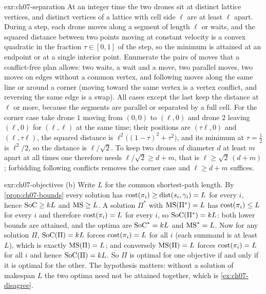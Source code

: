 \begin{solution}{exr:ch07-separation}
At an integer time the two drones sit at distinct lattice vertices, and distinct vertices of a lattice with cell side $\ell$ are at least $\ell$ apart. During a step, each drone moves along a segment of length $\ell$ or waits, and the squared distance between two points moving at constant velocity is a convex quadratic in the fraction $\tau\in[0,1]$ of the step, so the minimum is attained at an endpoint or at a single interior point. Enumerate the pairs of moves that a conflict-free plan allows: two waits, a wait and a move, two parallel moves, two moves on edges without a common vertex, and following moves along the same line or around a corner (moving toward the same vertex is a vertex conflict, and reversing the same edge is a swap). All cases except the last keep the distance at $\ell$ or more, because the segments are parallel or separated by a full cell. For the corner case take drone $1$ moving from $(0,0)$ to $(\ell,0)$ and drone $2$ leaving $(\ell,0)$ for $(\ell,\ell)$ at the same time; their positions are $(\tau\ell,0)$ and $(\ell,\tau\ell)$, the squared distance is $\ell^2\bigl((1-\tau)^2+\tau^2\bigr)$, and its minimum at $\tau=\tfrac12$ is $\ell^2/2$, so the distance is $\ell/\sqrt2$. To keep two drones of diameter $d$ at least $m$ apart at all times one therefore needs $\ell/\sqrt2\ge d+m$, that is $\ell\ge\sqrt2\,(d+m)$; forbidding following conflicts removes the corner case and $\ell\ge d+m$ suffices.
\end{solution}

\begin{solution}{exr:ch07-objectives}
(b) Write $L$ for the common shortest-path length. By \cref{prop:ch07-bounds} every solution has $\operatorname{cost}(\pi_i)\ge \operatorname{dist}(s_i,\gamma_i)=L$ for every $i$, hence $\mathrm{SoC}\ge kL$ and $\mathrm{MS}\ge L$. A solution $\Pi^\ast$ with $\mathrm{MS}(\Pi^\ast)=L$ has $\operatorname{cost}(\pi_i)\le L$ for every $i$ and therefore $\operatorname{cost}(\pi_i)=L$ for every $i$, so $\mathrm{SoC}(\Pi^\ast)=kL$: both lower bounds are attained, and the optima are $\mathrm{SoC}^\ast=kL$ and $\mathrm{MS}^\ast=L$. Now for any solution $\Pi$, $\mathrm{SoC}(\Pi)=kL$ forces $\operatorname{cost}(\pi_i)=L$ for all $i$ (each summand is at least $L$), which is exactly $\mathrm{MS}(\Pi)=L$; and conversely $\mathrm{MS}(\Pi)=L$ forces $\operatorname{cost}(\pi_i)=L$ for all $i$ and hence $\mathrm{SoC}(\Pi)=kL$. So $\Pi$ is optimal for one objective if and only if it is optimal for the other. The hypothesis matters: without a solution of makespan $L$ the two optima need not be attained together, which is \cref{ex:ch07-disagree}.
\end{solution}

